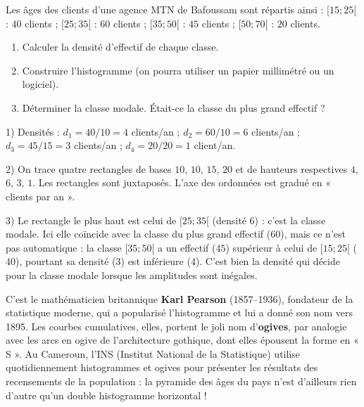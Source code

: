 \documentclass[11pt]{article}
\begin{document}
\begin{exercice}
Les âges des clients d'une agence MTN de Bafoussam sont répartis ainsi :
$[15;25[$ : $40$ clients ; $[25;35[$ : $60$ clients ; $[35;50[$ : $45$ clients ; $[50;70[$ : $20$ clients.
\begin{enumerate}
\item Calculer la densité d'effectif de chaque classe.
\item Construire l'histogramme (on pourra utiliser un papier millimétré ou un logiciel).
\item Déterminer la classe modale. Était-ce la classe du plus grand effectif ?
\end{enumerate}
\end{exercice}

\begin{corrige}[Exercice 1]
1) Densités :
$d_1 = 40/10 = 4$ clients/an ;
$d_2 = 60/10 = 6$ clients/an ;
$d_3 = 45/15 = 3$ clients/an ;
$d_4 = 20/20 = 1$ client/an.

2) On trace quatre rectangles de bases $10$, $10$, $15$, $20$ et de hauteurs respectives $4$, $6$, $3$, $1$. Les rectangles sont juxtaposés. L'axe des ordonnées est gradué en « clients par an ».

3) Le rectangle le plus haut est celui de $[25;35[$ (densité $6$) : c'est la classe modale. Ici elle coïncide avec la classe du plus grand effectif ($60$), mais ce n'est pas automatique : la classe $[35;50[$ a un effectif ($45$) supérieur à celui de $[15;25[$ ($40$), pourtant sa densité ($3$) est inférieure ($4$). C'est bien la densité qui décide pour la classe modale lorsque les amplitudes sont inégales.
\end{corrige}

\begin{savaistu}
C'est le mathématicien britannique \textbf{Karl Pearson} (1857--1936), fondateur de la statistique moderne, qui a popularisé l'histogramme et lui a donné son nom vers 1895. Les courbes cumulatives, elles, portent le joli nom d'\textbf{ogives}, par analogie avec les arcs en ogive de l'architecture gothique, dont elles épousent la forme en « S ». Au Cameroun, l'INS (Institut National de la Statistique) utilise quotidiennement histogrammes et ogives pour présenter les résultats des recensements de la population : la pyramide des âges du pays n'est d'ailleurs rien d'autre qu'un double histogramme horizontal !
\end{savaistu}
\end{document}
